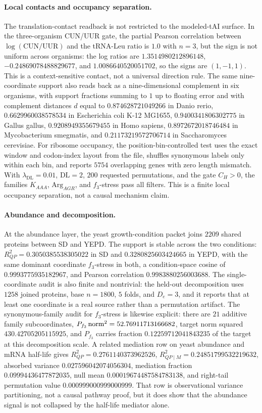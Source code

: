 \paragraph{Local contacts and occupancy separation.}
The translation-contact readback is not restricted to the modeled-tAI surface. In the three-organism CUN/UUR gate, the partial Pearson correlation between $\log(\mathrm{CUN/UUR})$ and the tRNA-Leu ratio is $1.0$ with $n=3$, but the sign is not uniform across organisms: the log ratios are $1.3514980212896148$, $-0.24869078488829677$, and $1.0086640520051702$, so the signs are $(1,-1,1)$. This is a context-sensitive contact, not a universal direction rule. The same nine-coordinate support also reads back as a nine-dimensional complement in six organisms, with support fractions summing to $1$ up to floating error and with complement distances $d$ equal to $0.874628721049266$ in Danio rerio, $0.6629960038578534$ in Escherichia coli K-12 MG1655, $0.9400341806302775$ in Gallus gallus, $0.9208949355679455$ in Homo sapiens, $0.8972672018746484$ in Mycobacterium smegmatis, and $0.21173219572706714$ in Saccharomyces cerevisiae. For ribosome occupancy, the position-bin-controlled test uses the exact window and codon-index layout from the file, shuffles synonymous labels only within each bin, and reports $5754$ overlapping genes with zero length mismatch. With $\lambda_{\mathrm{DL}}=0.01$, $\mathrm{DL}=2$, $200$ requested permutations, and the gate $C_H>0$, the families $K_{AAA}$, $\mathrm{Arg}_{AGR}$, and $f_3$-stress pass all filters. This is a finite local occupancy separation, not a causal mechanism claim.

\paragraph{Abundance and decomposition.}
At the abundance layer, the yeast growth-condition packet joins $2209$ shared proteins between SD and YEPD. The support is stable across the two conditions: $R^2_{QP}=0.3050385538305022$ in SD and $0.3280825603424665$ in YEPD, with the same dominant coordinate $f_3$-stress in both, a condition-space cosine of $0.9993775935182967$, and Pearson correlation $0.9983880256003688$. The single-coordinate audit is also finite and nontrivial: the held-out decomposition uses $1258$ joined proteins, base $n=1800$, $5$ folds, and $D_e=3$, and it reports that at least one coordinate is a real source rather than a permutation artifact. The synonymous-family audit for $f_3$-stress is likewise explicit: there are $21$ additive family subcoordinates, $P_{f_3}\text{\,norm}^2=52.76911713166682$, target norm squared $430.42705205115925$, and $P_{f_3}$ carries fraction $0.12259712041843235$ of the target at this decomposition scale. A related mediation row on yeast abundance and mRNA half-life gives $R^2_{QP}=0.2761140373962526$, $R^2_{QP\mid M}=0.24851799532219632$, absorbed variance $0.027596042074056304$, mediation fraction $0.09994436477872035$, null mean $0.00019674487584783138$, and right-tail permutation value $0.000999000999000999$. That row is observational variance partitioning, not a causal pathway proof, but it does show that the abundance signal is not collapsed by the half-life mediator alone.

